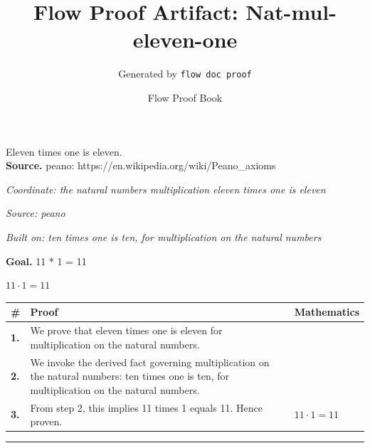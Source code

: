\documentclass[11pt]{article}
\title{Flow Proof Artifact: Nat-mul-eleven-one}
\author{Generated by \texttt{flow doc proof}}
\date{Flow Proof Book}
\theoremstyle{definition}
\begin{document}
\maketitle
Eleven times one is eleven.\\[0.5em]
\textbf{Source.} peano: https://en.wikipedia.org/wiki/Peano\_axioms\\[0.5em]
\bigskip
{}\par
\smallskip\noindent\textit{Coordinate: the natural numbers \cdot multiplication \cdot eleven times one is eleven}\par
\smallskip\noindent\textit{Source: peano}\par
\smallskip\noindent\textit{Built on: ten times one is ten, for multiplication on the natural numbers}\par
\medskip
\noindent\textbf{Goal.} 11 * 1 = 11\par
\noindent$\displaystyle 11 \cdot 1 = 11$\par
\medskip
\noindent
\begin{tabular}{@{} >{\raggedright\arraybackslash}p{} >{\raggedright\arraybackslash}p{} >{\raggedleft\arraybackslash}p{} @{}}
\textbf{\#} & \textbf{Proof} & \textbf{Mathematics} \\
\midrule
\textbf{1.} & We prove that eleven times one is eleven for multiplication on the natural numbers. & \\[0.45em]
\textbf{2.} & We invoke the derived fact governing multiplication on the natural numbers: ten times one is ten, for multiplication on the natural numbers. & \\[0.45em]
\textbf{3.} & From step 2, this implies 11 times 1 equals 11. Hence proven. & $\displaystyle 11 \cdot 1 = 11$ \\[0.45em]
\bottomrule
\end{tabular}
\label{thm:Nat-multiplication-eleven_times_one_is_eleven}
\par\medskip\hrule
\end{document}
